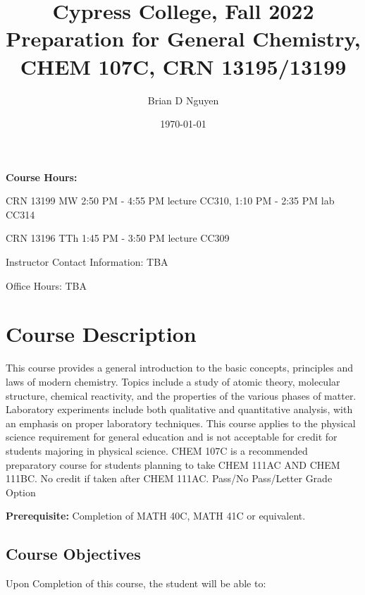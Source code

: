 \documentclass[11pt]{article}
\title{\textbf{Cypress College, Fall 2022 \\
    Preparation for General Chemistry, CHEM 107C, CRN 13195/13199}}
\author{Brian D Nguyen}
\date{\today}
\begin{document}
\maketitle 

\textbf{Course Hours:}

CRN 13199 MW 2:50 PM - 4:55 PM lecture CC310, 1:10 PM - 2:35 PM lab CC314

CRN 13196 TTh 1:45 PM - 3:50 PM lecture CC309

Instructor Contact Information: TBA

Office Hours: TBA

\section{Course Description}
This course provides a general introduction to the basic concepts, principles and laws
of modern chemistry. Topics include a study of atomic theory, molecular structure,
chemical reactivity, and the properties of the various phases of matter. Laboratory
experiments include both qualitative and quantitative analysis, with an emphasis on
proper laboratory techniques. This course applies to the physical science requirement
for general education and is not acceptable for credit for students majoring in physical
science. CHEM 107C is a recommended preparatory course for students planning to take
CHEM 111AC AND CHEM 111BC. No credit if taken after CHEM 111AC. Pass/No Pass/Letter
Grade Option

\textbf{Prerequisite:}  Completion of MATH 40C, MATH 41C or equivalent.

\subsection{Course Objectives}
Upon Completion of this course, the student will be able to:
\end{document}

